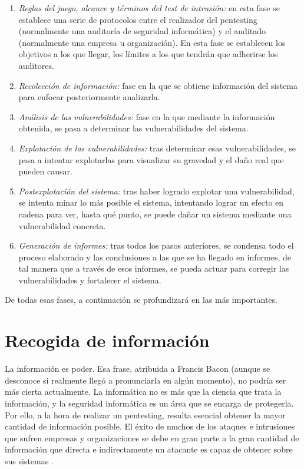 \begin{enumerate}
	\item \emph{Reglas del juego, alcance y términos del test de intrusión:} en esta fase se establece una serie de protocolos entre el realizador del pentesting (normalmente una auditoría de seguridad informática) y el auditado (normalmente una empresa u organización). En esta fase se establecen los objetivos a los que llegar, los límites a los que tendrán que adherirse los auditores.
	\item \emph{Recolección de información:} fase en la que se obtiene información del sistema para enfocar posteriormente analizarla.
	\item \emph{Análisis de las vulnerabilidades:} fase en la que mediante la información obtenida, se pasa a determinar las vulnerabilidades del sistema.
	\item \emph{Explotación de las vulnerabilidades:} tras determinar esas vulnerabilidades, se pasa a intentar explotarlas para visualizar su gravedad y el daño real que pueden causar.
	\item \emph{Postexplotación del sistema:} tras haber logrado explotar una vulnerabilidad, se intenta minar lo más posible el sistema, intentando lograr un efecto en cadena para ver, hasta qué punto, se puede dañar un sistema mediante una vulnerabilidad concreta.
	\item \emph{Generación de informes:} tras todos los pasos anteriores, se condensa todo el proceso elaborado y las conclusiones a las que se ha llegado en informes, de tal manera que a través de esos informes, se pueda actuar para corregir las vulnerabilidades y fortalecer el sistema.
\end{enumerate}

De todas esas fases, a continuación se profundizará en las más importantes.

\section{Recogida de información}

La información es poder. Esa frase, atribuida a Francis Bacon (aunque se desconoce si realmente llegó a pronunciarla en algún momento), no podría ser más cierta actualmente. La informática no es más que la ciencia que trata la información, y la seguridad informática es un área que se encarga de protegerla. Por ello, a la hora de realizar un pentesting, resulta esencial obtener la mayor cantidad de información posible. El éxito de muchos de los ataques e intrusiones que sufren empresas y organizaciones se debe en gran parte a la gran cantidad de información que directa e indirectamente un atacante es capaz de obtener sobre sus sistemas \cite{inteco-gathering}.

